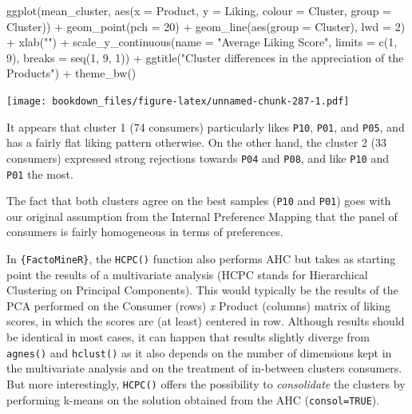 \documentclass[
]{krantz}
\makeatletter
\newenvironment{Shaded}{\begin{snugshade}}{\end{snugshade}}
\newcommand{\AttributeTok}[1]{\textcolor[rgb]{0.61,0.61,0.61}{#1}}
\newcommand{\DecValTok}[1]{\textcolor[rgb]{0.06,0.06,0.06}{#1}}
\newcommand{\FunctionTok}[1]{\textcolor[rgb]{0,0,0}{#1}}
\newcommand{\NormalTok}[1]{#1}
\newcommand{\SpecialCharTok}[1]{\textcolor[rgb]{0,0,0}{#1}}
\newcommand{\StringTok}[1]{\textcolor[rgb]{0.5,0.5,0.5}{#1}}
\renewenvironment{quote}{\begin{VF}}{\end{VF}}
\newenvironment{kframe}{%
\medskip{}
\setlength{\fboxsep}{.8em}
 \def\at@end@of@kframe{}%
 \ifinner\ifhmode%
  \def\at@end@of@kframe{\end{minipage}}%
  \begin{minipage}{\columnwidth}%
 \fi\fi%
 \def\FrameCommand##1{\hskip\@totalleftmargin \hskip-\fboxsep
 \colorbox{shadecolor}{##1}\hskip-\fboxsep
     \hskip-\linewidth \hskip-\@totalleftmargin \hskip\columnwidth}%
 \MakeFramed {\advance\hsize-\width
   \@totalleftmargin\z@ \linewidth\hsize
   \@setminipage}}%
 {\par\unskip\endMakeFramed%
 \at@end@of@kframe}
\renewenvironment{Shaded}{\begin{kframe}}{\end{kframe}}
\makeatother
\begin{document}
\begin{Shaded}
\begin{Highlighting}[]
\FunctionTok{ggplot}\NormalTok{(mean\_cluster, }\FunctionTok{aes}\NormalTok{(}\AttributeTok{x =}\NormalTok{ Product, }\AttributeTok{y =}\NormalTok{ Liking, }
                         \AttributeTok{colour =}\NormalTok{ Cluster, }\AttributeTok{group =}\NormalTok{ Cluster)) }\SpecialCharTok{+}
  \FunctionTok{geom\_point}\NormalTok{(}\AttributeTok{pch =} \DecValTok{20}\NormalTok{) }\SpecialCharTok{+}
  \FunctionTok{geom\_line}\NormalTok{(}\FunctionTok{aes}\NormalTok{(}\AttributeTok{group =}\NormalTok{ Cluster), }\AttributeTok{lwd =} \DecValTok{2}\NormalTok{) }\SpecialCharTok{+}
  \FunctionTok{xlab}\NormalTok{(}\StringTok{""}\NormalTok{) }\SpecialCharTok{+}
  \FunctionTok{scale\_y\_continuous}\NormalTok{(}\AttributeTok{name =} \StringTok{"Average Liking Score"}\NormalTok{, }
                     \AttributeTok{limits =} \FunctionTok{c}\NormalTok{(}\DecValTok{1}\NormalTok{, }\DecValTok{9}\NormalTok{), }\AttributeTok{breaks =} \FunctionTok{seq}\NormalTok{(}\DecValTok{1}\NormalTok{, }\DecValTok{9}\NormalTok{, }\DecValTok{1}\NormalTok{)) }\SpecialCharTok{+}
  \FunctionTok{ggtitle}\NormalTok{(}\StringTok{"Cluster differences in the appreciation of the Products"}\NormalTok{) }\SpecialCharTok{+}
  \FunctionTok{theme\_bw}\NormalTok{()}
\end{Highlighting}
\end{Shaded}

\texttt{[image: bookdown\_files/figure-latex/unnamed-chunk-287-1.pdf]}

It appears that cluster 1 (74 consumers) particularly likes \texttt{P10}, \texttt{P01}, and \texttt{P05}, and has a fairly flat liking pattern otherwise. On the other hand, the cluster 2 (33 consumers) expressed strong rejections towards \texttt{P04} and \texttt{P08}, and like \texttt{P10} and \texttt{P01} the most.

The fact that both clusters agree on the best samples (\texttt{P10} and \texttt{P01}) goes with our original assumption from the Internal Preference Mapping that the panel of consumers is fairly homogeneous in terms of preferences.

\begin{quote}
In \texttt{\{FactoMineR\}}, the \texttt{HCPC()} function also performs AHC but takes as starting point the results of a multivariate analysis (HCPC stands for Hierarchical Clustering on Principal Components). This would typically be the results of the PCA performed on the Consumer (rows) \emph{x} Product (columns) matrix of liking scores, in which the scores are (at least) centered in row.
Although results should be identical in most cases, it can happen that results slightly diverge from \texttt{agnes()} and \texttt{hclust()} as it also depends on the number of dimensions kept in the multivariate analysis and on the treatment of in-between clusters consumers. But more interestingly, \texttt{HCPC()} offers the possibility to \emph{consolidate} the clusters by performing k-means on the solution obtained from the AHC (\texttt{consol=TRUE}).
\end{quote}
\end{document}
